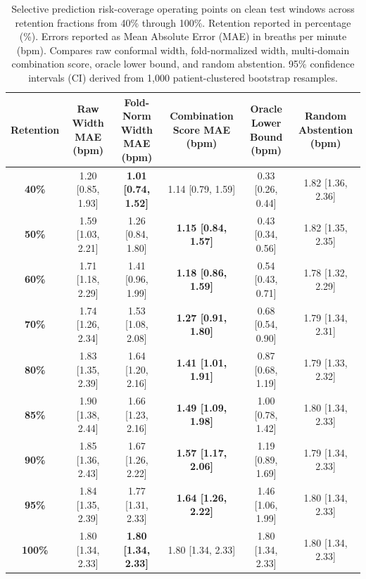 \begin{table}[htbp]
\centering
\caption{Selective prediction risk-coverage operating points on clean test windows across retention fractions from 40\% through 100\%. Retention reported in percentage (\%). Errors reported as Mean Absolute Error (MAE) in breaths per minute (bpm). Compares raw conformal width, fold-normalized width, multi-domain combination score, oracle lower bound, and random abstention. 95\% confidence intervals (CI) derived from 1,000 patient-clustered bootstrap resamples.}
\label{tab:risk_coverage_retention}
\begin{tabular}{cccccc}
\toprule
\textbf{Retention} & \textbf{Raw Width MAE (bpm)} & \textbf{Fold-Norm Width MAE (bpm)} & \textbf{Combination Score MAE (bpm)} & \textbf{Oracle Lower Bound (bpm)} & \textbf{Random Abstention (bpm)} \\
\midrule
\textbf{40\%} & 1.20 [0.85, 1.93] & \textbf{1.01 [0.74, 1.52]} & 1.14 [0.79, 1.59] & 0.33 [0.26, 0.44] & 1.82 [1.36, 2.36] \\
\textbf{50\%} & 1.59 [1.03, 2.21] & 1.26 [0.84, 1.80] & \textbf{1.15 [0.84, 1.57]} & 0.43 [0.34, 0.56] & 1.82 [1.35, 2.35] \\
\textbf{60\%} & 1.71 [1.18, 2.29] & 1.41 [0.96, 1.99] & \textbf{1.18 [0.86, 1.59]} & 0.54 [0.43, 0.71] & 1.78 [1.32, 2.29] \\
\textbf{70\%} & 1.74 [1.26, 2.34] & 1.53 [1.08, 2.08] & \textbf{1.27 [0.91, 1.80]} & 0.68 [0.54, 0.90] & 1.79 [1.34, 2.31] \\
\textbf{80\%} & 1.83 [1.35, 2.39] & 1.64 [1.20, 2.16] & \textbf{1.41 [1.01, 1.91]} & 0.87 [0.68, 1.19] & 1.79 [1.33, 2.32] \\
\textbf{85\%} & 1.90 [1.38, 2.44] & 1.66 [1.23, 2.16] & \textbf{1.49 [1.09, 1.98]} & 1.00 [0.78, 1.42] & 1.80 [1.34, 2.33] \\
\textbf{90\%} & 1.85 [1.36, 2.43] & 1.67 [1.26, 2.22] & \textbf{1.57 [1.17, 2.06]} & 1.19 [0.89, 1.69] & 1.79 [1.34, 2.33] \\
\textbf{95\%} & 1.84 [1.35, 2.39] & 1.77 [1.31, 2.33] & \textbf{1.64 [1.26, 2.22]} & 1.46 [1.06, 1.99] & 1.80 [1.34, 2.33] \\
\textbf{100\%} & 1.80 [1.34, 2.33] & \textbf{1.80 [1.34, 2.33]} & 1.80 [1.34, 2.33] & 1.80 [1.34, 2.33] & 1.80 [1.34, 2.33] \\
\bottomrule
\end{tabular}
\end{table}


